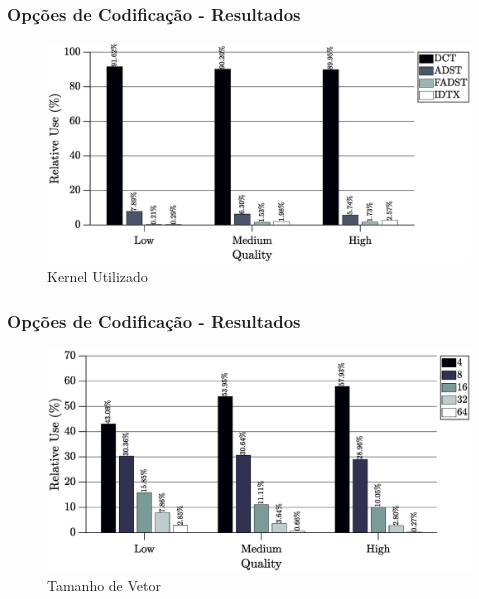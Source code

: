 \documentclass{beamer}
\begin{document}
\begin{frame}
       \frametitle{Opções de Codificação - Resultados}              
       \begin{center}
                     \begin{figure}[h]
                            \centering
                            \includegraphics[width=\textwidth]{Figures/kernelAvg.eps}
                            \caption{Kernel Utilizado}
                     \end{figure}
       \end{center}
\end{frame}

\begin{frame}
       \frametitle{Opções de Codificação - Resultados}              
       \begin{center}
                     \begin{figure}[h]
                            \centering
                            \includegraphics[width=\textwidth]{Figures/vectSizAvg.eps}
                            \caption{Tamanho de Vetor}
                     \end{figure}
       \end{center}
\end{frame}
\end{document}
